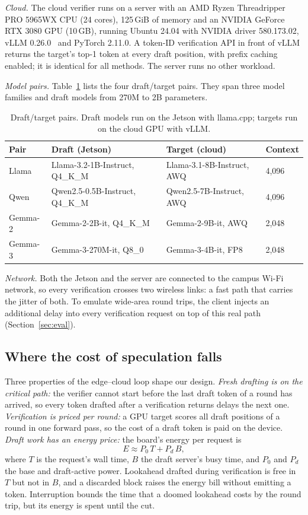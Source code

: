 \emph{Cloud.} The cloud verifier runs on a server with an AMD Ryzen Threadripper PRO 5965WX CPU (24 cores), 125\,GiB of memory and an NVIDIA GeForce RTX 3080 GPU (10\,GB), running Ubuntu 24.04 with NVIDIA driver 580.173.02, vLLM 0.26.0~\cite{vllm2023} and PyTorch 2.11.0. A token-ID verification API in front of vLLM returns the target's top-1 token at every draft position, with prefix caching enabled; it is identical for all methods. The server runs no other workload.

\emph{Model pairs.} Table~\ref{tab:pairs} lists the four draft/target pairs. They span three model families and draft models from 270M to 2B parameters.

\begin{table}[t]
\centering
\caption{Draft/target pairs. Draft models run on the Jetson with llama.cpp; targets run on the cloud GPU with vLLM.}
\label{tab:pairs}
\footnotesize
\setlength{\tabcolsep}{3pt}
\begin{tabular}{@{}llll@{}}
\toprule
Pair & Draft (Jetson) & Target (cloud) & Context\\
\midrule
Llama & Llama-3.2-1B-Instruct, Q4\_K\_M & Llama-3.1-8B-Instruct, AWQ & 4,096\\
Qwen & Qwen2.5-0.5B-Instruct, Q4\_K\_M & Qwen2.5-7B-Instruct, AWQ & 4,096\\
Gemma-2 & Gemma-2-2B-it, Q4\_K\_M & Gemma-2-9B-it, AWQ & 2,048\\
Gemma-3 & Gemma-3-270M-it, Q8\_0 & Gemma-3-4B-it, FP8 & 2,048\\
\bottomrule
\end{tabular}
\end{table}

\emph{Network.} Both the Jetson and the server are connected to the campus Wi-Fi network, so every verification crosses two wireless links: a fast path that carries the jitter of both. To emulate wide-area round trips, the client injects an additional delay into every verification request on top of this real path (Section~\ref{sec:eval}).

\subsection{Where the cost of speculation falls}
Three properties of the edge--cloud loop shape our design. \emph{Fresh drafting is on the critical path:} the verifier cannot start before the last draft token of a round has arrived, so every token drafted after a verification returns delays the next one. \emph{Verification is priced per round:} a GPU target scores all draft positions of a round in one forward pass, so the cost of a draft token is paid on the device. \emph{Draft work has an energy price:} the board's energy per request is
\begin{equation}
E \approx P_0\, T + P_d\, B, \label{eq:energy}
\end{equation}
where $T$ is the request's wall time, $B$ the draft server's busy time, and $P_0$ and $P_d$ the base and draft-active power. Lookahead drafted during verification is free in $T$ but not in $B$, and a discarded block raises the energy bill without emitting a token. Interruption bounds the time that a doomed lookahead costs by the round trip, but its energy is spent until the cut.

